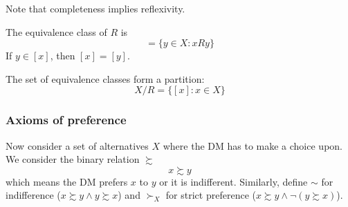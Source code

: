 \documentclass[12pt]{extarticle}
\begin{document}
Note that completeness implies reflexivity.

The equivalence class of $R$ is
\begin{equation}
	[x] = \{ y \in X : xRy \}
\end{equation}
If $y \in [x]$, then $[x] = [y]$.

The set of equivalence classes form a partition:
\begin{equation}
	X/R = \{ [x] : x \in X \}
\end{equation}

\subsubsection{Axioms of preference}

Now consider a set of alternatives $X$ where the DM has to make a choice upon.
We consider the binary relation $\succsim$
\begin{equation}
	x \succsim y
\end{equation}
which means the DM prefers $x$ to $y$ or it is indifferent.
Similarly, define $\sim$ for indifference ($x \succsim y \land y \succsim x$) and
$\succ_X$ for strict preference ($x \succsim y \land \lnot (y \succsim x)$).
\end{document}
